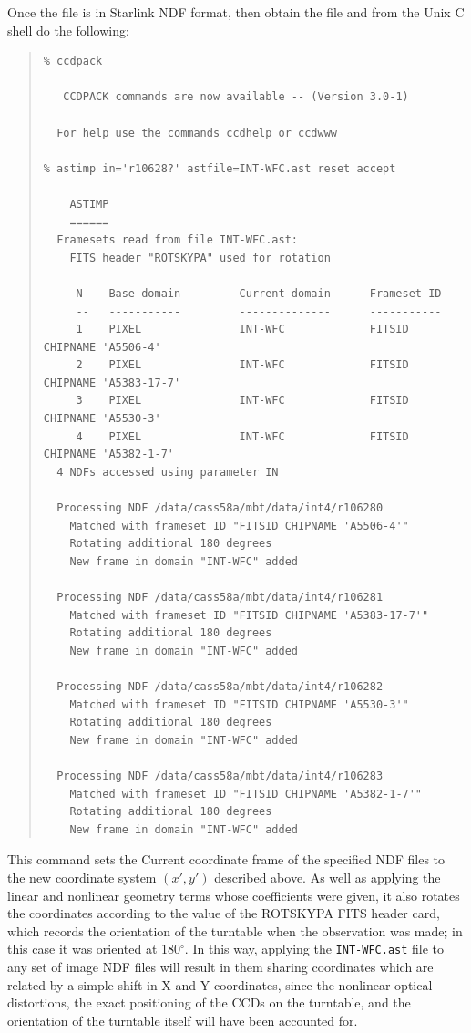 \documentclass[11pt]{article}
\newenvironment{squote}{\begin{quote}\small}{\end{quote}}
\begin{document}
Once the file is in Starlink NDF format, then obtain the file 
and from the Unix C shell do the following:
\begin{squote}
\begin{verbatim}
% ccdpack 

   CCDPACK commands are now available -- (Version 3.0-1)
   
  For help use the commands ccdhelp or ccdwww

% astimp in='r10628?' astfile=INT-WFC.ast reset accept

    ASTIMP
    ======
  Framesets read from file INT-WFC.ast:
    FITS header "ROTSKYPA" used for rotation

     N    Base domain         Current domain      Frameset ID
     --   -----------         --------------      -----------
     1    PIXEL               INT-WFC             FITSID CHIPNAME 'A5506-4'
     2    PIXEL               INT-WFC             FITSID CHIPNAME 'A5383-17-7'
     3    PIXEL               INT-WFC             FITSID CHIPNAME 'A5530-3'
     4    PIXEL               INT-WFC             FITSID CHIPNAME 'A5382-1-7'
  4 NDFs accessed using parameter IN

  Processing NDF /data/cass58a/mbt/data/int4/r106280
    Matched with frameset ID "FITSID CHIPNAME 'A5506-4'"
    Rotating additional 180 degrees
    New frame in domain "INT-WFC" added

  Processing NDF /data/cass58a/mbt/data/int4/r106281
    Matched with frameset ID "FITSID CHIPNAME 'A5383-17-7'"
    Rotating additional 180 degrees
    New frame in domain "INT-WFC" added

  Processing NDF /data/cass58a/mbt/data/int4/r106282
    Matched with frameset ID "FITSID CHIPNAME 'A5530-3'"
    Rotating additional 180 degrees
    New frame in domain "INT-WFC" added

  Processing NDF /data/cass58a/mbt/data/int4/r106283
    Matched with frameset ID "FITSID CHIPNAME 'A5382-1-7'"
    Rotating additional 180 degrees
    New frame in domain "INT-WFC" added
\end{verbatim}
\end{squote}
This command sets the Current coordinate frame of the specified 
NDF files to the new coordinate system $(x',y')$ described above.
As well as applying the linear and nonlinear geometry terms whose
coefficients were given,
it also rotates the coordinates according to the value of the
ROTSKYPA FITS header card, which records the orientation of the
turntable when the observation was made;
in this case it was oriented at 180$^\circ$.
In this way, applying the {\tt INT-WFC.ast} file to any set of 
image NDF files will result in them sharing coordinates which 
are related by a simple shift in X and Y coordinates, 
since the nonlinear optical distortions, 
the exact positioning of the CCDs on the turntable,
and the orientation of the turntable itself will have been
accounted for. 
\end{document}
